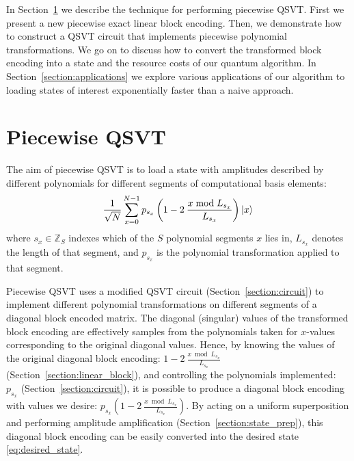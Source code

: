 In Section~\ref{section:piecewise_qsvt} we describe the technique for performing piecewise QSVT. First we present a new piecewise exact linear block encoding. Then, we demonstrate how to construct a QSVT circuit that implements piecewise polynomial transformations. We go on to discuss how to convert the transformed block encoding into a state and the resource costs of our quantum algorithm. In Section~\ref{section:applications} we explore various applications of our algorithm to loading states of interest exponentially faster than a naive approach.  


\section{Piecewise QSVT}
\label{section:piecewise_qsvt}
The aim of piecewise QSVT is to load a state with amplitudes described by different polynomials for different segments of computational basis elements:
\begin{equation}
    \frac{1}{\sqrt{N}}\sum_{x=0}^{N-1} p_{s_x}\left( 1 - 2\>\frac{x \bmod L_{s_x}}{L_{s_x}}\right)  \ket{x}
    \label{eq:desired_state}
\end{equation}
where $s_x \in \mathbb{Z}_S$ indexes which of the $S$ polynomial segments $x$ lies in, $L_{s_x}$ denotes the length of that segment, and $p_{s_x}$ is the polynomial transformation applied to that segment.

Piecewise QSVT uses a modified QSVT circuit (Section~\ref{section:circuit}) to implement different polynomial transformations on different segments of a diagonal block encoded matrix. The diagonal (singular) values of the transformed block encoding are effectively samples from the polynomials taken for $x$-values corresponding to the original diagonal values. Hence, by knowing the values of the original diagonal block encoding: $1 - 2\>\frac{x \bmod L_{s_x}}{L_{s_x}}$ (Section~\ref{section:linear_block}), and controlling the polynomials implemented: $p_{s_x}$ (Section~\ref{section:circuit}), it is possible to produce a diagonal block encoding with values we desire: $p_{s_x}\left( 1 - 2\>\frac{x \bmod L_{s_x}}{L_{s_x}}\right) $. By acting on a uniform superposition and performing amplitude amplification (Section~\ref{section:state_prep}), this diagonal block encoding can be easily converted into the desired state \eqref{eq:desired_state}.


